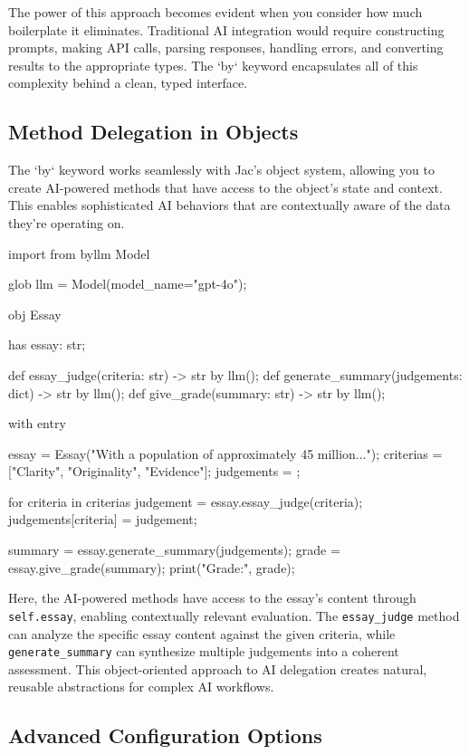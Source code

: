 The power of this approach becomes evident when you consider how much boilerplate it eliminates. Traditional AI integration would require constructing prompts, making API calls, parsing responses, handling errors, and converting results to the appropriate types. The `by` keyword encapsulates all of this complexity behind a clean, typed interface.

\subsection{Method Delegation in Objects}

The `by` keyword works seamlessly with Jac's object system, allowing you to create AI-powered methods that have access to the object's state and context. This enables sophisticated AI behaviors that are contextually aware of the data they're operating on.

\begin{jacblock}
import from byllm { Model }

glob llm = Model(model_name="gpt-4o");

obj Essay {
    has essay: str;

    def essay_judge(criteria: str) -> str by llm();
    def generate_summary(judgements: dict) -> str by llm();
    def give_grade(summary: str) -> str by llm();
}

with entry {
    essay = Essay("With a population of approximately 45 million...");
    criterias = ["Clarity", "Originality", "Evidence"];
    judgements = {};

    for criteria in criterias {
        judgement = essay.essay_judge(criteria);
        judgements[criteria] = judgement;
    }

    summary = essay.generate_summary(judgements);
    grade = essay.give_grade(summary);
    print("Grade:", grade);
}
\end{jacblock}

Here, the AI-powered methods have access to the essay's content through \texttt{self.essay}, enabling contextually relevant evaluation. The \texttt{essay\_judge} method can analyze the specific essay content against the given criteria, while \texttt{generate\_summary} can synthesize multiple judgements into a coherent assessment. This object-oriented approach to AI delegation creates natural, reusable abstractions for complex AI workflows.

\subsection{Advanced Configuration Options}

